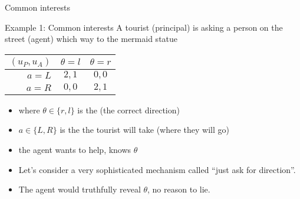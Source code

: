 \documentclass[english,10pt
,aspectratio=169
]{beamer}
\begin{document}
\begin{frame}{Common interests}
	\begin{exampleblock}{Example 1: Common interests}
		A tourist (principal) is asking a person on the street (agent) which way to the mermaid statue
		\begin{center}
			\begin{tabular}{r | c | c |}
				$(u_P,u_A)$	& $\theta=l$	& $\theta=r$
				\\ \hline 
				$a=L$ 		& $2,1$			& $0,0$
				\\ \hline
				$a=R$		& $0,0$			& $2,1$
				\\ \hline 
			\end{tabular}
		\end{center}
	\end{exampleblock}
	 
	\begin{itemize}
		\item where $\theta\in \{r,l\}$ is the  (the correct direction)
		\item $a \in \{L,R\}$ is the  the tourist will take (where they will go)
		\item the agent wants to help, knows $\theta$
		\pause \bigskip 
		\item Let's consider a very sophisticated \alert<2>{mechanism} called ``just ask for direction''.
		\pause
		\item The agent would truthfully reveal $\theta$, no reason to lie.
	\end{itemize}
\end{frame}
\end{document}
